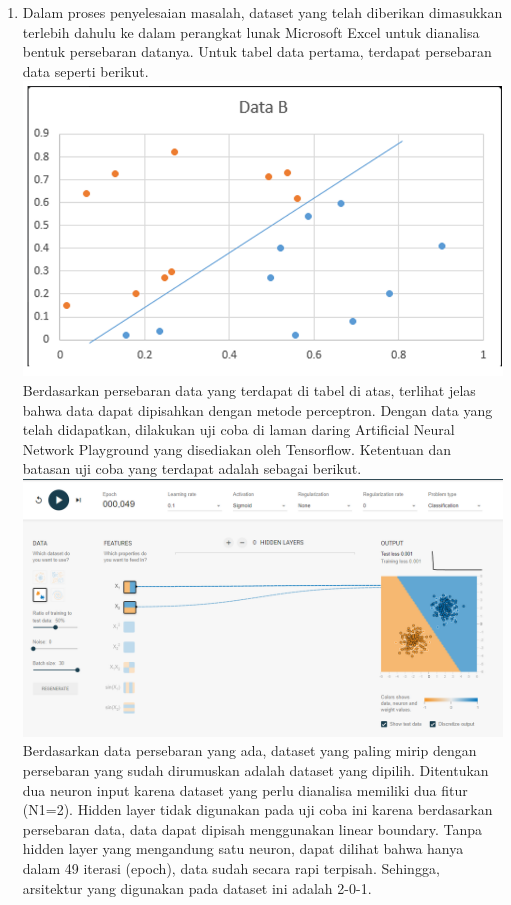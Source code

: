 \documentclass[12pt]{article}
\begin{document}
\begin{enumerate}[label=(\alph*)]
	\item %
	Dalam proses penyelesaian masalah, dataset yang telah diberikan dimasukkan terlebih dahulu ke dalam perangkat lunak Microsoft Excel untuk dianalisa bentuk persebaran datanya. Untuk tabel data pertama, terdapat persebaran data seperti berikut.\\
	\includegraphics[scale=1]{UASFiskom0303.png}\\
	Berdasarkan persebaran data yang terdapat di tabel di atas, terlihat jelas bahwa data dapat dipisahkan dengan metode perceptron. Dengan data yang telah didapatkan, dilakukan uji coba di laman daring Artificial Neural Network Playground yang disediakan oleh Tensorflow. Ketentuan dan batasan uji coba yang terdapat adalah sebagai berikut. \\
	\includegraphics[scale=0.4]{UASFiskom0304.png}\\
	Berdasarkan data persebaran yang ada, dataset yang paling mirip dengan persebaran yang sudah dirumuskan adalah dataset yang dipilih. Ditentukan dua neuron input karena dataset yang perlu dianalisa memiliki dua fitur (N1=2). Hidden layer tidak digunakan pada uji coba ini karena berdasarkan persebaran data, data dapat dipisah menggunakan linear boundary. Tanpa hidden layer yang mengandung satu neuron, dapat dilihat bahwa hanya dalam 49 iterasi (epoch), data sudah secara rapi terpisah. Sehingga, arsitektur yang digunakan pada dataset ini adalah 2-0-1.

\end{enumerate}
\end{document}
